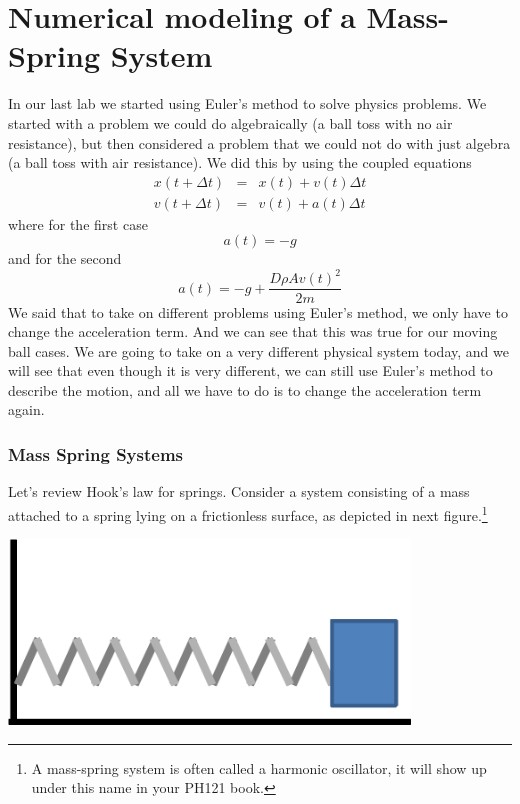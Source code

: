 \documentclass[twoside,11pt,ShortChapTitles]{BYUTextbook}
\begin{document}
\chapter{Numerical modeling of a Mass-Spring System}

In our last lab we started using Euler's method to solve physics problems.
We started with a problem we could do algebraically (a ball toss with no air
resistance), but then considered a problem that we could not do with just
algebra (a ball toss with air resistance). We did this by using the coupled
equations 
\begin{eqnarray*}
x(t+\Delta t) &=&x(t)+v(t)\Delta t \\
v(t+\Delta t) &=&v(t)+a\left( t\right) \Delta t
\end{eqnarray*}%
where for the first case 
\[
a\left( t\right) =-g 
\]%
and for the second 
\[
a\left( t\right) =-g+\frac{D\rho Av(t)^{2}}{2m} 
\]%
We said that to take on different problems using Euler's method, we only
have to change the acceleration term. And we can see that this was true for
our moving ball cases. We are going to take on a very different physical
system today, and we will see that even though it is very different, we can
still use Euler's method to describe the motion, and all we have to do is to
change the acceleration term again.

\subsection{Mass Spring Systems}

Let's review Hook's law for springs. Consider a system consisting of a mass
attached to a spring lying on a frictionless surface, as depicted in next
figure.\footnote{%
A mass-spring system is often called a harmonic oscillator, it will show up
under this name in your PH121 book.}

\bigskip

\begin{center}
\includegraphics[width=0.8\textwidth]{Lab8_figs/mass_on_spring.pdf}
\end{center}
\end{document}
